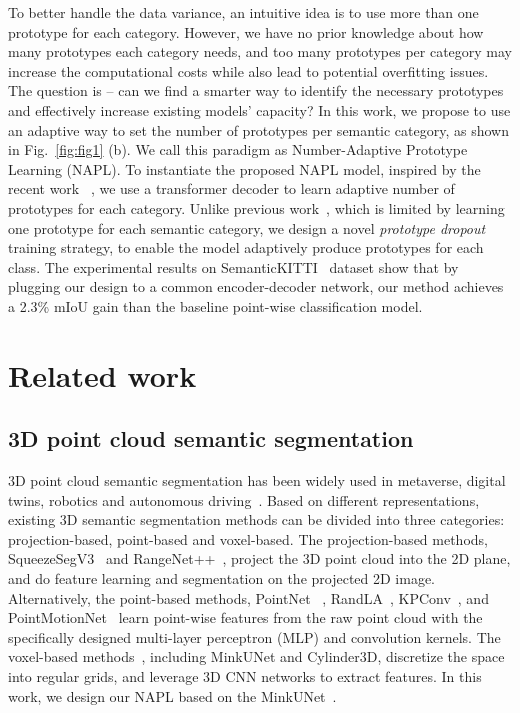 \documentclass[runningheads]{llncs}
\begin{document}
To better handle the data variance, an intuitive idea is to use more than one prototype for each category. However, we have no prior knowledge about how many prototypes each category needs, and too many prototypes per category may increase the computational costs while also lead to potential overfitting issues. The question is -- can we find a smarter way to identify the necessary prototypes and effectively increase existing models' capacity? In this work, we propose to use an adaptive way to set the number of prototypes per semantic category, as shown in Fig.~\ref{fig:fig1} (b). We call this paradigm as Number-Adaptive Prototype Learning (NAPL).
To instantiate the proposed NAPL model, inspired by the recent work~\cite{cheng2021per,strudel2021segmenter}
, we use a transformer decoder to learn adaptive number of prototypes for each category. Unlike previous work~\cite{cheng2021per,strudel2021segmenter}, which is limited by learning one prototype for each semantic category, we design a novel \textit{prototype dropout} training strategy, to enable the model adaptively produce prototypes for each class. The experimental results on SemanticKITTI~\cite{behley2019semantickitti} dataset show that 
by plugging our design to a common encoder-decoder network,
our method achieves a 2.3\% mIoU gain than the baseline point-wise classification model.

\section{Related work}

\subsection{3D point cloud semantic segmentation}

3D point cloud semantic segmentation has been widely used in metaverse, digital twins, robotics and autonomous driving~\cite{chen2019suma++,wu2020motionnet}.
Based on different representations, existing 3D semantic segmentation methods can be divided into three categories: projection-based, point-based and voxel-based. The projection-based methods, SqueezeSegV3~\cite{xu2020squeezesegv3} and RangeNet++~\cite{milioto2019rangenet++}, project the 3D point cloud into the 2D plane, and do feature learning and segmentation on the projected 2D image. 
Alternatively, the point-based methods, PointNet ~\cite{qi2017pointnet},  RandLA~\cite{hu2020randla}, KPConv~\cite{thomas2019kpconv}, and PointMotionNet~\cite{wang2022pointmotionnet} learn point-wise features from the raw point cloud with the specifically designed multi-layer perceptron (MLP) and convolution kernels.
The voxel-based methods~\cite{choy20194d,zhu2021cylindrical}, including MinkUNet and Cylinder3D, discretize the space into regular grids, and leverage 3D CNN networks to extract features. In this work, we design our NAPL based on the MinkUNet~\cite{choy20194d}. 
\end{document}
